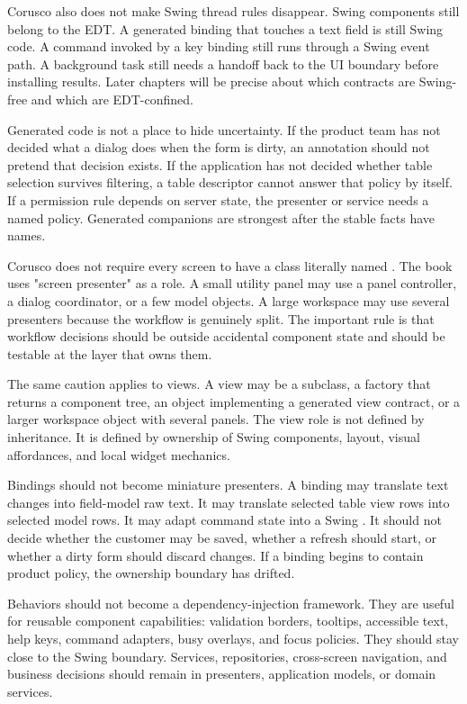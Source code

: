 Corusco also does not make Swing thread rules disappear. Swing components still belong to the EDT. A generated binding that touches a text field is still Swing code. A command invoked by a key binding still runs through a Swing event path. A background task still needs a handoff back to the UI boundary before installing results. Later chapters will be precise about which contracts are Swing-free and which are EDT-confined.

Generated code is not a place to hide uncertainty. If the product team has not decided what a dialog does when the form is dirty, an annotation should not pretend that decision exists. If the application has not decided whether table selection survives filtering, a table descriptor cannot answer that policy by itself. If a permission rule depends on server state, the presenter or service needs a named policy. Generated companions are strongest after the stable facts have names.

Corusco does not require every screen to have a class literally named . The book uses "screen presenter" as a role. A small utility panel may use a panel controller, a dialog coordinator, or a few model objects. A large workspace may use several presenters because the workflow is genuinely split. The important rule is that workflow decisions should be outside accidental component state and should be testable at the layer that owns them.

The same caution applies to views. A view may be a  subclass, a factory that returns a component tree, an object implementing a generated view contract, or a larger workspace object with several panels. The view role is not defined by inheritance. It is defined by ownership of Swing components, layout, visual affordances, and local widget mechanics.

Bindings should not become miniature presenters. A binding may translate text changes into field-model raw text. It may translate selected table view rows into selected model rows. It may adapt command state into a Swing . It should not decide whether the customer may be saved, whether a refresh should start, or whether a dirty form should discard changes. If a binding begins to contain product policy, the ownership boundary has drifted.

Behaviors should not become a dependency-injection framework. They are useful for reusable component capabilities: validation borders, tooltips, accessible text, help keys, command adapters, busy overlays, and focus policies. They should stay close to the Swing boundary. Services, repositories, cross-screen navigation, and business decisions should remain in presenters, application models, or domain services.

